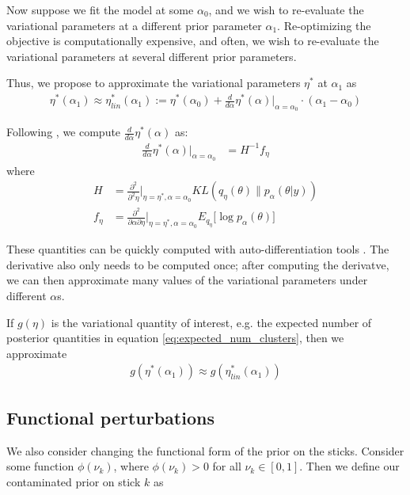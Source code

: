 \documentclass{article}
\begin{document}
Now suppose we fit the model at some $\alpha_0$, and we wish to re-evaluate the
variational parameters at a different prior parameter $\alpha_1$. Re-optimizing
the objective is computationally expensive, and often, we wish to re-evaluate
the variational parameters at several different prior parameters.

Thus, we propose to approximate the variational parameters $\eta^*$ at
$\alpha_1$ as
%
\begin{align}
    \eta^*(\alpha_1) \approx \eta^*_{lin}(\alpha_1)
    := \eta^*(\alpha_0) +
    \frac{d}{d\alpha}\eta^*(\alpha)\Big|_{\alpha=\alpha_0} \cdot (\alpha_1 - \alpha_0)
    \label{eq:our_approximation}
\end{align}

Following \citet{giordano:2017:covariances},  we compute
$\frac{d}{d\alpha}\eta^*(\alpha) $ as:
%
\begin{align}
  \frac{d}{d\alpha}\eta^*(\alpha)\Big|_{\alpha=\alpha_0} &= H^{-1} f_\eta \label{eq:vb_sensitivty}
\end{align}
%
where
%
\begin{align}
  H &= \frac{\partial^2}{\partial^2\eta}\Big\rvert_{\eta = \eta^*, \alpha = \alpha_0}
  KL(q_\eta\left(\theta\right) \| p_\alpha(\theta | y)) \\
  f_\eta &= \frac{\partial^2}{\partial \alpha \partial \eta}
    \Big\rvert_{\eta = \eta^*, \alpha = \alpha_0} E_{q_{\eta}}
    \big[\log p_\alpha(\theta)\big]
\end{align}

These quantities can be quickly computed with auto-differentiation tools
\citep{maclaurin:2015:autograd}. The derivative also only needs to be computed
once; after computing the derivatve, we can then approximate many values of the
variational parameters under different $\alpha$s.

If $g(\eta)$ is the variational quantity of interest, e.g. the expected number
of posterior quantities in equation \ref{eq:expected_num_clusters}, then we
approximate
%
\begin{align}
    g(\eta^*(\alpha_1)) \approx g(\eta^*_{lin}(\alpha_1))
\end{align}

\subsection{Functional perturbations}
\label{sec:func_pert}
%
We also consider changing the functional form of the prior on the sticks.
Consider some function $\phi(\nu_k)$, where $\phi(\nu_k) > 0$ for all $\nu_k \in
[0, 1]$. Then we define our contaminated prior on stick $k$ as
\end{document}
